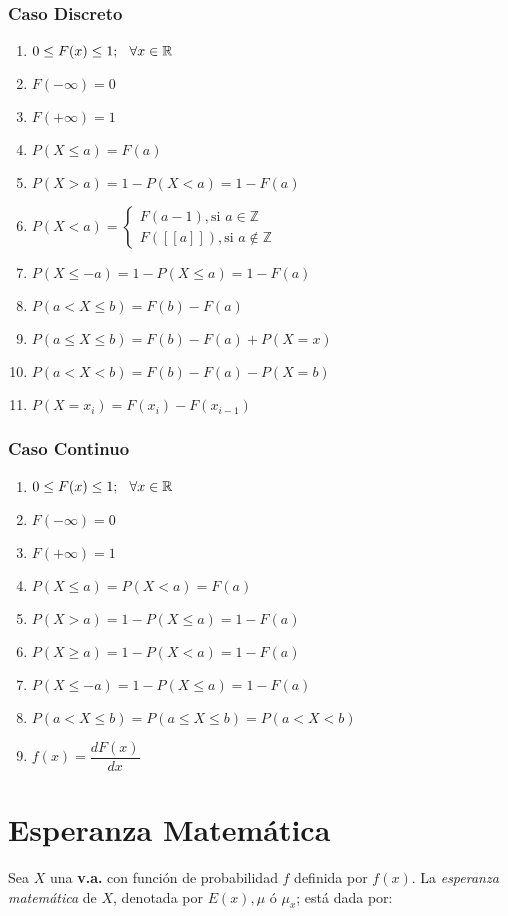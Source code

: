 \subsubsection{Caso Discreto}
\begin{enumerate}
\item $0\leq F(x) \leq 1;\hspace{0.25cm}\forall x\in\mathbb{R}$
\item $F(-\infty)=0$
\item $F(+\infty)=1$
\item $P(X\leq a) = F(a)$
\item $P(X>a)=1-P(X<a)=1-F(a)$
\item $P(X<a)=
\begin{cases}
F(a-1), \text{si } a\in\mathbb{Z} \\
F([\![ a ]\!]), \text{si } a\notin \mathbb{Z}
\end{cases}
$
\item $P(X\leq -a)=1-P(X\leq a)=1-F(a)$
\item $P(a<X\leq b)=F(b)-F(a)$
\item $P(a\leq X \leq b)=F(b)-F(a)+P(X=x)$
\item $P(a<X<b)=F(b)-F(a)-P(X=b)$
\item $P(X=x_i)=F(x_i)-F(x_{i-1})$
\end{enumerate}
\subsubsection{Caso Continuo}
\begin{enumerate}
\item $0\leq F(x) \leq 1; \hspace{0.25cm}\forall x\in\mathbb{R}$
\item $F(-\infty)=0$
\item $F(+\infty)=1$
\item $P(X\leq a)=P(X<a)=F(a)$
\item $P(X>a)=1-P(X\leq a)=1-F(a)$
\item $P(X\geq a)=1-P(X<a)=1-F(a)$
\item $P(X\leq -a)=1-P(X\leq a)=1-F(a)$
\item $P(a<X\leq b)=P(a\leq X\leq b)=P(a<X<b)$
\item $f(x)=\dfrac{d F(x)}{dx}$
\end{enumerate}
\section{Esperanza Matemática}
Sea $X$ una \textbf{v.a.} con función de probabilidad $f$ definida por $f(x)$. La \textit{esperanza matemática} de $X$, denotada por $E(x),\mu$ ó $\mu_x$; está dada por:

